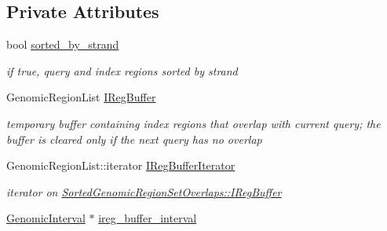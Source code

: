 \subsection*{Private Attributes}
\begin{CompactItemize}
\item 
\hypertarget{classSortedGenomicRegionSetOverlaps_f08c449faa6ba7be7c6ed9c07f4226e3}{
bool \hyperlink{classSortedGenomicRegionSetOverlaps_f08c449faa6ba7be7c6ed9c07f4226e3}{sorted\_\-by\_\-strand}}
\label{classSortedGenomicRegionSetOverlaps_f08c449faa6ba7be7c6ed9c07f4226e3}

\begin{CompactList}\small\item\em if true, query and index regions sorted by strand \item\end{CompactList}\item 
\hypertarget{classSortedGenomicRegionSetOverlaps_19fa18e6abd9f045786698fff48a445f}{
GenomicRegionList \hyperlink{classSortedGenomicRegionSetOverlaps_19fa18e6abd9f045786698fff48a445f}{IRegBuffer}}
\label{classSortedGenomicRegionSetOverlaps_19fa18e6abd9f045786698fff48a445f}

\begin{CompactList}\small\item\em temporary buffer containing index regions that overlap with current query; the buffer is cleared only if the next query has no overlap \item\end{CompactList}\item 
\hypertarget{classSortedGenomicRegionSetOverlaps_71d6eea0c4bf9f19be6cf0c0c562f297}{
GenomicRegionList::iterator \hyperlink{classSortedGenomicRegionSetOverlaps_71d6eea0c4bf9f19be6cf0c0c562f297}{IRegBufferIterator}}
\label{classSortedGenomicRegionSetOverlaps_71d6eea0c4bf9f19be6cf0c0c562f297}

\begin{CompactList}\small\item\em iterator on \hyperlink{classSortedGenomicRegionSetOverlaps_19fa18e6abd9f045786698fff48a445f}{SortedGenomicRegionSetOverlaps::IRegBuffer} \item\end{CompactList}\item 
\hypertarget{classSortedGenomicRegionSetOverlaps_962f8e6ce8c15703cfefa574a07ce42c}{
\hyperlink{classGenomicInterval}{GenomicInterval} $\ast$ \hyperlink{classSortedGenomicRegionSetOverlaps_962f8e6ce8c15703cfefa574a07ce42c}{ireg\_\-buffer\_\-interval}}
\label{classSortedGenomicRegionSetOverlaps_962f8e6ce8c15703cfefa574a07ce42c}


\end{CompactItemize}
